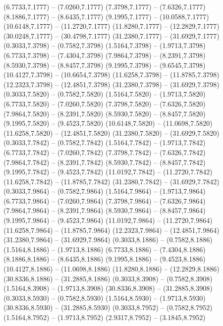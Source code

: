 {\begin{scope}[shift={(#1,#2)}]
    (6.7733,7.1777) -- (7.0260,7.1777)
    (7.3798,7.1777) -- (7.6326,7.1777)
    (8.1886,7.1777) -- (8.6435,7.1777)
    (9.1995,7.1777) -- (10.0588,7.1777)
    (10.6148,7.1777) -- (11.2720,7.1777)
    (11.8280,7.1777) -- (12.2829,7.1777)
    (30.0248,7.1777) -- (30.4798,7.1777)
    (31.2380,7.1777) -- (31.6929,7.1777)
    (0.3033,7.3798) -- (0.7582,7.3798)
    (1.5164,7.3798) -- (1.9713,7.3798)
    (6.7733,7.3798) -- (7.4304,7.3798)
    (7.9864,7.3798) -- (8.2391,7.3798)
    (8.5930,7.3798) -- (8.8457,7.3798)
    (9.1995,7.3798) -- (9.6545,7.3798)
    (10.4127,7.3798) -- (10.6654,7.3798)
    (11.6258,7.3798) -- (11.8785,7.3798)
    (12.2323,7.3798) -- (12.4851,7.3798)
    (31.2380,7.3798) -- (31.6929,7.3798)
    (0.3033,7.5820) -- (0.7582,7.5820)
    (1.5164,7.5820) -- (1.9713,7.5820)
    (6.7733,7.5820) -- (7.0260,7.5820)
    (7.3798,7.5820) -- (7.6326,7.5820)
    (7.9864,7.5820) -- (8.2391,7.5820)
    (8.5930,7.5820) -- (8.8457,7.5820)
    (9.1995,7.5820) -- (9.4523,7.5820)
    (10.6148,7.5820) -- (11.0698,7.5820)
    (11.6258,7.5820) -- (12.4851,7.5820)
    (31.2380,7.5820) -- (31.6929,7.5820)
    (0.3033,7.7842) -- (0.7582,7.7842)
    (1.5164,7.7842) -- (1.9713,7.7842)
    (6.7733,7.7842) -- (7.0260,7.7842)
    (7.3798,7.7842) -- (7.6326,7.7842)
    (7.9864,7.7842) -- (8.2391,7.7842)
    (8.5930,7.7842) -- (8.8457,7.7842)
    (9.1995,7.7842) -- (9.4523,7.7842)
    (11.0192,7.7842) -- (11.2720,7.7842)
    (11.6258,7.7842) -- (11.8785,7.7842)
    (31.2380,7.7842) -- (31.6929,7.7842)
    (0.3033,7.9864) -- (0.7582,7.9864)
    (1.5164,7.9864) -- (1.9713,7.9864)
    (6.7733,7.9864) -- (7.0260,7.9864)
    (7.3798,7.9864) -- (7.6326,7.9864)
    (7.9864,7.9864) -- (8.2391,7.9864)
    (8.5930,7.9864) -- (8.8457,7.9864)
    (9.1995,7.9864) -- (9.4523,7.9864)
    (11.0192,7.9864) -- (11.2720,7.9864)
    (11.6258,7.9864) -- (11.8785,7.9864)
    (12.2323,7.9864) -- (12.4851,7.9864)
    (31.2380,7.9864) -- (31.6929,7.9864)
    (0.3033,8.1886) -- (0.7582,8.1886)
    (1.5164,8.1886) -- (1.9713,8.1886)
    (6.7733,8.1886) -- (7.4304,8.1886)
    (8.1886,8.1886) -- (8.6435,8.1886)
    (9.1995,8.1886) -- (9.4523,8.1886)
    (10.4127,8.1886) -- (11.0698,8.1886)
    (11.8280,8.1886) -- (12.2829,8.1886)
    (30.8336,8.1886) -- (31.2885,8.1886)
    (0.3033,8.3908) -- (0.7582,8.3908)
    (1.5164,8.3908) -- (1.9713,8.3908)
    (30.8336,8.3908) -- (31.2885,8.3908)
    (0.3033,8.5930) -- (0.7582,8.5930)
    (1.5164,8.5930) -- (1.9713,8.5930)
    (30.8336,8.5930) -- (31.2885,8.5930)
    (0.3033,8.7952) -- (0.7582,8.7952)
    (1.5164,8.7952) -- (1.9713,8.7952)
    (2.9317,8.7952) -- (3.1845,8.7952)

\end{scope}}
